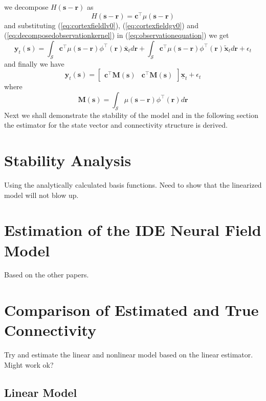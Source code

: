 \documentclass[onecolumn,draftcls]{IEEEtran}
\begin{document}
 we decompose $ H(\mathbf s-\mathbf r)$ as
 \begin{equation}
  H(\mathbf s-\mathbf r)= \mathbf c^{\top}\mu(\mathbf s-\mathbf r)
\label{eq:decomposedobservationkernel}
\end{equation}
and substituting  (\ref{eq:cortexfieldlv0}), (\ref{eq:cortexfieldgv0}) and (\ref{eq:decomposedobservationkernel}) in (\ref{eq:observationequation}) we get
\begin{equation}
 \mathbf y_t(\mathbf s)=\int_{\mathcal S}\mathbf c^{\top}\mu(\mathbf s-\mathbf r)\phi^{\top}(\mathbf r)\bar{\mathbf x}_{t}d\mathbf r+\int_{\mathcal S}\mathbf c^{\top}\mu(\mathbf s-\mathbf r)\phi^{\top}(\mathbf r)\tilde{\mathbf x}_{t}d\mathbf r+\epsilon_t
\end{equation}
and finally we have
\begin{equation}
\mathbf y_t(\mathbf s)= \begin{bmatrix}\mathbf c^{\top}\mathbf M(\mathbf s)&\mathbf c^{\top}\mathbf M(\mathbf s)\end{bmatrix}\underline{\mathbf x}_t+\epsilon_t
\end{equation}
where
\begin{equation}
 \mathbf M(\mathbf s)=\int_{\mathcal S}\mu(\mathbf s-\mathbf r)\phi^{\top}(\mathbf r)d\mathbf r
\end{equation}
Next we shall demonstrate the stability of the model and in the following section the estimator for the state vector and connectivity structure is derived.

\section{Stability Analysis}
Using the analytically calculated basis functions. Need to show that the linearized model will not blow up.

\section{Estimation of the IDE Neural Field Model}
Based on the other papers.

\section{Comparison of Estimated and True Connectivity}
Try and estimate the linear and nonlinear model based on the linear estimator. Might work ok?

\subsection{Linear Model}
\end{document}
